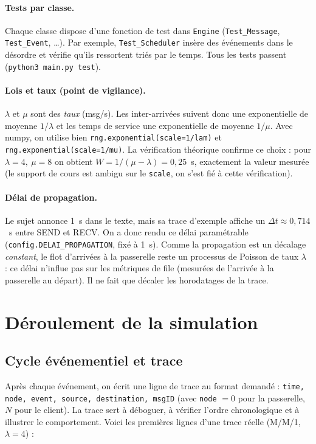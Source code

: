 \documentclass[11pt,a4paper]{article}
\begin{document}
\paragraph{Tests par classe.} Chaque classe dispose d'une fonction de test dans
\texttt{Engine} (\texttt{Test\_Message}, \texttt{Test\_Event}, \dots). Par exemple,
\texttt{Test\_Scheduler} insère des événements dans le désordre et vérifie qu'ils
ressortent triés par le temps. Tous les tests passent
(\texttt{python3 main.py test}).

\paragraph{Lois et taux (point de vigilance).} $\lambda$ et $\mu$ sont des
\emph{taux} (msg/s). Les inter-arrivées suivent donc une exponentielle de moyenne
$1/\lambda$ et les temps de service une exponentielle de moyenne $1/\mu$. Avec
numpy, on utilise bien \texttt{rng.exponential(scale=1/lam)} et
\texttt{rng.exponential(scale=1/mu)}. La vérification théorique confirme ce choix :
pour $\lambda=4,\ \mu=8$ on obtient $W = 1/(\mu-\lambda) = 0{,}25$~s, exactement la
valeur mesurée (le support de cours est ambigu sur le \texttt{scale}, on s'est
fié à cette vérification).

\paragraph{Délai de propagation.} Le sujet annonce 1~s dans le texte, mais sa
trace d'exemple affiche un $\Delta t \approx 0{,}714$~s entre SEND et RECV. On a
donc rendu ce délai paramétrable (\texttt{config.DELAI\_PROPAGATION}, fixé à
1~s). Comme la propagation est un décalage \emph{constant}, le flot d'arrivées à
la passerelle reste un processus de Poisson de taux $\lambda$ : ce délai n'influe
pas sur les métriques de file (mesurées de l'arrivée à la passerelle au départ).
Il ne fait que décaler les horodatages de la trace.

\section{Déroulement de la simulation}
\subsection{Cycle événementiel et trace}
Après chaque événement, on écrit une ligne de trace au format demandé :
\texttt{time, node, event, source, destination, msgID} (avec
\texttt{node} $=0$ pour la passerelle, $N$ pour le client). La trace sert à
déboguer, à vérifier l'ordre chronologique et à illustrer le comportement.
Voici les premières lignes d'une trace réelle (M/M/1, $\lambda=4$) :
\end{document}
